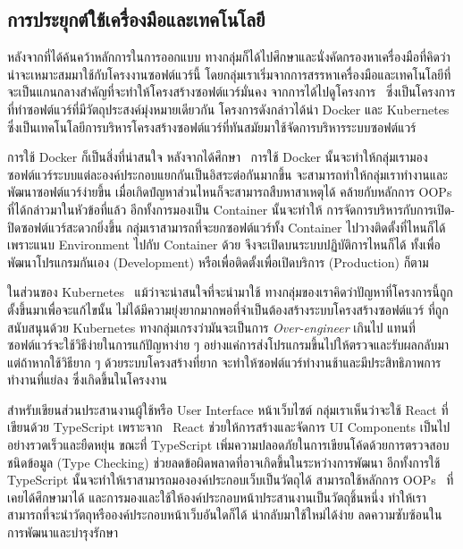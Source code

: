 \documentclass[12pt,one side,openright,a4paper]{cpe-thesis-th}
\newcommand{\thaijustify}[1]{%
  \par\hspace{30pt}\justifying
  #1
}
\begin{document}
    \subsection{การประยุกต์ใช้เครื่องมือและเทคโนโลยี}
        \thaijustify{
            หลังจากที่ได้ค้นคว้าหลักการในการออกแบบ ทางกลุ่มก็ได้ไปศึกษาและนั่งคัดกรองหาเครื่องมือที่คิดว่าน่าจะเหมาะสมมาใช้กับโครงงานซอฟต์แวร์นี้ โดยกลุ่มเราเริ่มจากการสรรหาเครื่องมือและเทคโนโลยีที่จะเป็นแกนกลางสำคัญที่จะทำให้โครงสร้างซอฟต์แวร์มั่นคง จากการได้ไปดูโครงการ~\cite{nattawat20pgs} ซึ่งเป็นโครงการที่ทำซอฟต์แวร์ที่มีวัตถุประสงค์มุ่งหมายเดียวกัน โครงการดังกล่าวได้นำ Docker และ Kubernetes ซึ่งเป็นเทคโนโลยีการบริหารโครงสร้างซอฟต์แวร์ที่ทันสมัยมาใช้จัดการบริหารระบบซอฟต์แวร์
        }
        \thaijustify{
            การใช้ Docker ก็เป็นสิ่งที่น่าสนใจ หลังจากได้ศึกษา~\cite{docker, yıldız23docker, dockerdummies, chesterwood21microservice, dockerdoc} การใช้ Docker นั้นจะทำให้กลุ่มเรามองซอฟต์แวร์ระบบแต่ละองค์ประกอบแยกกันเป็นอิสระต่อกันมากขึ้น จะสามารถทำให้กลุ่มเราทำงานและพัฒนาซอฟต์แวร์ง่ายขึ้น เมื่อเกิดปํญหาส่วนไหนก็จะสามารถสืบหาสาเหตุได้ คล้ายกับหลักการ OOPs ที่ได้กล่าวมาในหัวข้อที่แล้ว อีกทั้งการมองเป็น Container นั้นจะทำให้ การจัดการบริหารกับการเปิด-ปิดซอฟต์แวร์สะดวกยิ่งขึ้น กลุ่มเราสามารถที่จะยกซอฟต์แวร์ทั้ง Container ไปวางติดตั้งที่ไหนก็ได้ เพราะแนบ Environment ไปกับ Container ด้วย จึงจะเปิดบนระบบปฏิบัติการไหนก็ได้ ทั้งเพื่อพัฒนาโปรแกรมกันเอง (Development) หรือเพื่อติดตั้งเพื่อเปิดบริการ (Production) ก็ตาม
        }
        \thaijustify{
            ในส่วนของ Kubernetes~\cite{kubernetes, kubemed20} แม้ว่าจะน่าสนใจที่จะนำมาใช้ ทางกลุ่มของเราคิดว่าปัญหาที่โครงการนี้ถูกตั้งขึ้นมาเพื่อจะแก้ไขนั้น ไม่ได้มีความยุ่งยากมากพอที่จำเป็นต้องสร้างระบบโครงสร้างซอฟต์แวร์ ที่ถูกสนับสนุนด้วย Kubernetes ทางกลุ่มเกรงว่ามันจะเป็นการ \textit{Over-engineer} เกินไป แทนที่ซอฟต์แวร์จะใช้วิธีง่ายในการแก้ปัญหาง่าย ๆ อย่างแค่การส่งโปรแกรมขึ้นไปให้ตรวจและรับผลกลับมา แต่ถ้าหากใช้วิธียาก ๆ ด้วยระบบโครงสร้างที่ยาก จะทำให้ซอฟต์แวร์ทำงานช้าและมีประสิทธิภาพการทำงานที่แย่ลง ซึ่งเกิดขึ้นในโครงงาน~\cite{nattawat20pgs}
        }
        \thaijustify{
             สำหรับเขียนส่วนประสานงานผู้ใช้หรือ User Interface หน้าเว็บไซต์ กลุ่มเราเห็นว่าจะใช้ React ที่เขียนด้วย TypeScript เพราะจาก~\cite{flanagan20js, crockford08js, hejlsbergts, microsoftts, cherny19ts} React ช่วยให้การสร้างและจัดการ UI Components เป็นไปอย่างรวดเร็วและยืดหยุ่น ขณะที่ TypeScript เพิ่มความปลอดภัยในการเขียนโค้ดด้วยการตรวจสอบชนิดข้อมูล (Type Checking) ช่วยลดข้อผิดพลาดที่อาจเกิดขึ้นในระหว่างการพัฒนา อีกทั้งการใช้ TypeScript นั้นจะทำให้เราสามารถมององค์ประกอบเว็บเป็นวัตถุได้ สามารถใช้หลักการ OOPs~\cite{apollo22oop, moses22obj, johnson88classobj, sakpal18inheritance, stroustrup94inheritance, javapolymorph, nzeruekenneth23polymorph, ntu20polymorph, saladpukabstract, liskov87abstaction, raut22encapsule, nishad22encapsulation} ที่เคยได้ศึกษามาได้ และการมองและใช้ให้องค์ประกอบหน้าประสานงานเป็นวัตถุชิ้นหนึ่ง ทำให้เราสามารถที่จะนำวัตถุหรือองค์ประกอบหน้าเว็บอันใดก็ได้ นำกลับมาใช้ใหม่ได้ง่าย ลดความซับซ้อนในการพัฒนาและบำรุงรักษา
        }
\end{document}
